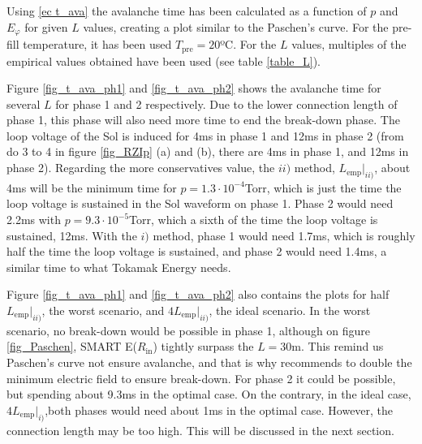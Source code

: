 \documentclass[a4paper,12pt,oneside]{book}
\begin{document}
Using \eqref{ec t_ava} the avalanche time has been calculated as a function of $p$ and $E_\varphi$ for given $L$ values, creating a plot similar to the Paschen's curve. For the pre-fill temperature, it has been used $T_\text{pre}=20$ºC. For the $L$ values, multiples of the empirical values obtained have been used (see table \ref{table_L}).

Figure \ref{fig_t_ava_ph1} and \ref{fig_t_ava_ph2} shows the avalanche time for several $L$ for phase 1 and 2 respectively. Due to the lower connection length of phase 1, this phase will also need more time to end the break-down phase. The loop voltage of the Sol is induced for 4ms in phase 1 and 12ms in phase 2 (from do 3 to 4 in figure \ref{fig_RZIp} (a) and (b), there are 4ms in phase 1, and 12ms in phase 2). Regarding the more conservatives value, the $ii)$ method, $L_\text{emp}|_{ii)}$, about 4ms will be the minimum time for $p=1.3 \cdot 10^{-4}$Torr, which is just the time the  loop voltage is sustained in the Sol waveform on phase 1. Phase 2 would need 2.2ms with $p=9.3 \cdot 10^{-5}$Torr, which a sixth of the time the loop voltage is sustained, 12ms. With the $i)$ method, phase 1 would need 1.7ms, which is roughly half the time the loop voltage is sustained, and phase 2 would need 1.4ms, a similar time to what Tokamak Energy needs.

Figure \ref{fig_t_ava_ph1} and \ref{fig_t_ava_ph2} also contains the plots for half $L_\text{emp}|_{ii)}$, the worst scenario, and $4 L_\text{emp}|_{ii)}$, the ideal scenario. In the worst scenario, no break-down would be possible in phase 1, although on figure \ref{fig_Paschen}, SMART E($R_\text{in}$) tightly surpass the $L=30$m. This remind us Paschen's curve not ensure avalanche, and that is why \cite{ITER_2007} recommends to double the minimum electric field to ensure break-down. For phase 2 it could be possible, but spending about 9.3ms in the optimal case. On the contrary, in the ideal case, $4 L_\text{emp}|_{i)}$,both phases would need about 1ms in the optimal case. However, the connection length may be too high. This will be discussed in the next section.
\end{document}
